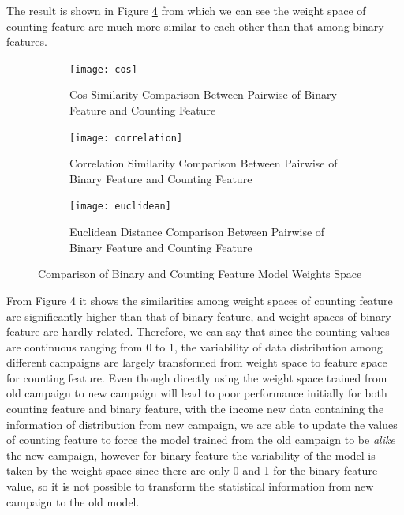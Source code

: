 The result is shown in Figure \ref{fig:three graphs} from which we can see the weight space of counting feature are much more similar to each other than that among binary features.
\begin{figure}[h]
    \centering
    \begin{subfigure}{0.3\textwidth}
        \texttt{[image: cos]}
        \caption{Cos Similarity Comparison Between Pairwise of Binary Feature and Counting Feature}
        \label{fig:cos}
    \end{subfigure}
    \hfill
    \begin{subfigure}{0.3\textwidth}
        \texttt{[image: correlation]}
        \caption{Correlation Similarity Comparison Between Pairwise of Binary Feature and Counting Feature}
        \label{fig:correlation}
    \end{subfigure}
    \hfill
    \begin{subfigure}{0.3\textwidth}
        \texttt{[image: euclidean]}
        \caption{Euclidean Distance Comparison Between Pairwise of Binary Feature and Counting Feature}
        \label{fig:euclidean}
    \end{subfigure}
    \caption{Comparison of Binary and Counting Feature Model Weights Space}
    \label{fig:three graphs}
\end{figure}

From Figure \ref{fig:three graphs} it shows the similarities among weight spaces of counting feature are significantly higher than that of binary feature, and weight spaces of binary feature are hardly related.  Therefore, we can say that since the counting values are continuous ranging from 0 to 1, the variability of data distribution among different campaigns are largely transformed from weight space to feature space for counting feature. Even though directly using the weight space trained from old campaign to new campaign will lead to poor performance initially for both counting feature and binary feature, with the income new data containing the information of distribution from new campaign, we are able to update the values of counting feature to force the model trained from the old campaign to be \textit{alike} the new campaign, however for binary feature the variability of the model is taken by the weight space since there are only 0 and 1 for the binary feature value, so it is not possible to transform the statistical information from new campaign to the old model. 

